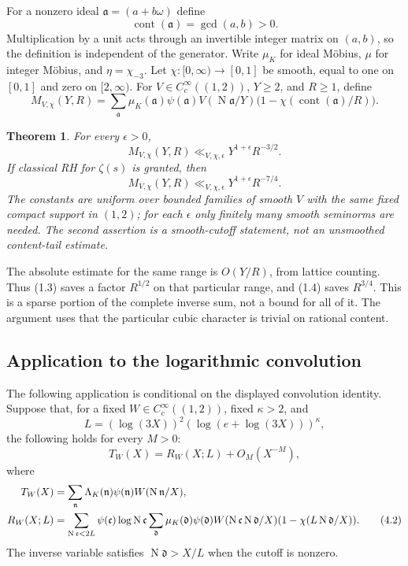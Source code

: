 \documentclass[11pt]{article}
\newtheorem{theorem}{Theorem}[section]
\newcommand{\N}{\operatorname N}
\newcommand{\cont}{\operatorname{cont}}
\begin{document}
For a nonzero ideal $\mathfrak a=(a+b\omega)$ define
\[
                 \cont(\mathfrak a)=\gcd(a,b)>0.
\]
Multiplication by a unit acts through an invertible integer matrix
on $(a,b)$, so the definition is independent of the generator.
Write $\mu_K$ for ideal M\"obius, $\mu$ for integer M\"obius,
and $\eta=\chi_{-3}$. Let $\chi:[0,\infty)\to[0,1]$ be smooth,
equal to one on $[0,1]$ and zero on $[2,\infty)$.
For $V\in C_c^\infty((1,2))$, $Y\ge2$, and $R\ge1$, define
\[
 M_{V,\chi}(Y,R)=
 \sum_{\mathfrak a}\mu_K(\mathfrak a)\psi(\mathfrak a)
 V(\N\mathfrak a/Y)
 \bigl(1-\chi(\cont(\mathfrak a)/R)\bigr).                 \tag{1.2}
\]

\begin{theorem}\label{thm:content}
For every $\epsilon>0$,
\[
 M_{V,\chi}(Y,R)
       \ll_{V,\chi,\epsilon}Y^{1+\epsilon}R^{-3/2}.        \tag{1.3}
\]
If classical RH for $\zeta(s)$ is granted, then
\[
 M_{V,\chi}(Y,R)
       \ll_{V,\chi,\epsilon}Y^{1+\epsilon}R^{-7/4}.        \tag{1.4}
\]
The constants are uniform over bounded families of smooth $V$
with the same fixed compact support in $(1,2)$; for each
$\epsilon$ only finitely many smooth seminorms are needed.
The second assertion is a smooth-cutoff statement, not an
unsmoothed content-tail estimate.
\end{theorem}

The absolute estimate for the same range is
$O(Y/R)$, from lattice counting. Thus (1.3) saves a factor
$R^{1/2}$ on that particular range, and (1.4) saves $R^{3/4}$.
This is a sparse portion of the complete inverse sum, not a bound
for all of it. The argument uses that the particular cubic
character is trivial on rational content.

\subsection{Application to the logarithmic convolution}

The following application is conditional on the displayed
convolution identity. Suppose that, for a fixed
$W\in C_c^\infty((1,2))$, fixed $\kappa>2$, and
\[
 L=(\log(3X))^2(\log(e+\log(3X)))^\kappa,
\]
the following holds for every $M>0$:
\[
 T_W(X)=R_W(X;L)+O_M(X^{-M}),                             \tag{4.1}
\]
where
\begin{align}
 T_W(X)&=\sum_{\mathfrak n}\Lambda_K(\mathfrak n)
               \psi(\mathfrak n)W(\N\mathfrak n/X),\notag\\
 R_W(X;L)&=\sum_{\N\mathfrak c<2L}\psi(\mathfrak c)
       \log\N\mathfrak c
       \sum_{\mathfrak d}\mu_K(\mathfrak d)\psi(\mathfrak d)
       W(\N\mathfrak c\N\mathfrak d/X)
       (1-\chi(L\N\mathfrak d/X)).                       \tag{4.2}
\end{align}
The inverse variable satisfies $\N\mathfrak d>X/L$ when
the cutoff is nonzero.
\end{document}
